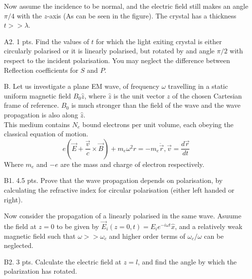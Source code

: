 \begin{problem}{}
 Now assume the incidence to be normal, and the electric field still makes an angle $\pi/4$ with the $z$-axis (As can be seen in the figure). The crystal has a thickness $t>>\lambda$. 
\end{problem}
\begin{subpr}{A2. \hfill 1 pts.} Find the values of $t$ for which the light exiting crystal is either circularly polarised or it is linearly polarised, but rotated by and angle $\pi/2$ with respect to the incident polarisation. You may neglect the difference between Reflection coefficients for $S$ and $P$.
\end{subpr}

\begin{problem}{B.}
 Let us investigate a plane EM wave, of frequency $\omega$ travelling in a static uniform magnetic field $B_0 \hat{z}$, where $\hat{z}$ is the unit vector $z$ of the chosen Cartesian frame of reference. $B_0$ is much stronger than the field of the wave and the wave propagation is also along $\hat{z}$. 
\\
 This medium contains $N_e$ bound electrons per unit volume, each obeying the classical equation of motion.
 \begin{equation}
e(\vec{E}+\frac{\vec{v}}{c}\times \vec{B}) +m_e \omega^2 r= -m_e \ddot{\vec{r}}, \vec{v}=\frac{d\vec{r}}
{dt}\end{equation}
Where $m_e$ and $-e$ are the mass and charge of electron respectively.
\end{problem}
\begin{subpr}{B1. \hfill 4.5 pts.} Prove that the wave propagation depends on polarisation, by calculating the refractive index for circular polarisation  (either left handed or right).
\end{subpr}
\begin{problem}{}
Now consider the propagation of a linearly polarised in the same wave. Asuume the field at $z=0$ to be given by $\vec{E}_i (z=0,t)=E_i e^{-i\omega t} \hat{x}$, and a relatively weak magnetic field such that $\omega >> \omega_c$ and higher order terms of $\omega_c/\omega$ can be neglected.
\end{problem}
\begin{subpr}{B2. \hfill 3 pts.} Calculate the electric field at $z=l$, and find the angle by which the polarization has rotated.
\end{subpr}
\clearpage
